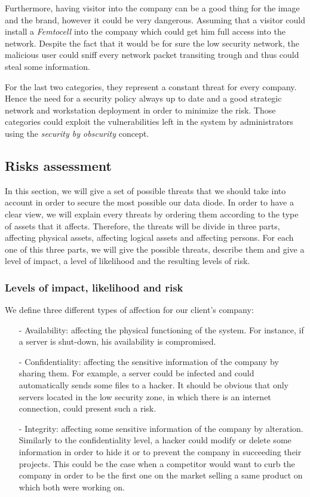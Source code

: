 \documentclass[a4paper,10pt]{article}
\begin{document}
Furthermore, having visitor into the company can be a good thing for the image and the brand, however it could be very dangerous. Assuming that a visitor could install a \emph{Femtocell} into the company which could get him full access into the network. Despite the fact that it would be for sure the low security network, the malicious user could sniff every network packet transiting trough and thus could steal some information.

For the last two categories, they represent a constant threat for every company. Hence the need for a security policy always up to date and a good strategic network and workstation deployment in order to minimize the risk. Those categories could exploit the vulnerabilities left in the system by administrators using the \emph{security by obscurity} concept.

\subsection{Risks assessment}
In this section, we will give a set of possible threats that we should take into account in order to secure the most possible our data diode. In order to have a clear view, we will explain every threats by ordering them according to the type of assets that it affects. Therefore, the threats will be divide in three parts, affecting physical assets, affecting logical assets and affecting persons. For each one of this three parts, we will give the possible threats, describe them and give a level of impact, a level of likelihood and the resulting levels of risk.

\subsubsection{Levels of impact, likelihood and risk}
We define three different types of affection for our client's company:
\begin{enumerate}
\item[-] Availability: affecting the physical functioning of the system. For instance, if a server is shut-down, his availability is compromised.
\item[-] Confidentiality: affecting the sensitive information of the company by sharing them. For example, a server could be infected and could automatically sends some files to a hacker. It should be obvious that only servers located in the low security zone, in which there is an internet connection, could present such a risk.
\item[-] Integrity: affecting some sensitive information of the company by alteration. Similarly to the confidentiality level, a hacker could modify or delete some information in order to hide it or to prevent the company in succeeding their projects. This could be the case when a competitor would want to curb the company in order to be the first one on the market selling a same product on which both were working on.
\end{enumerate}
\end{document}
